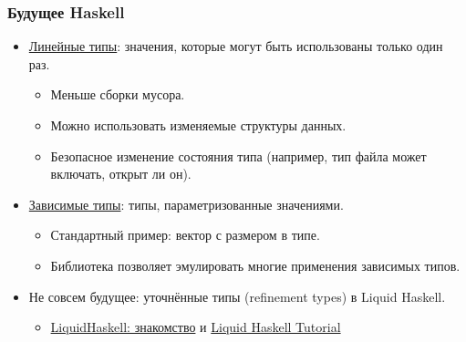 \documentclass[11pt]{beamer}
\begin{document}
\begin{frame}[fragile]
  \frametitle{Будущее Haskell}
  \begin{itemize}
    \item \href{https://www.tweag.io/posts/2017-03-13-linear-types.html}{Линейные типы}: значения, которые могут быть использованы только один раз.
          \begin{itemize}
            \item Меньше сборки мусора.
            \item Можно использовать изменяемые структуры данных.
            \item Безопасное изменение состояния типа (например, тип файла может включать, открыт ли он).
          \end{itemize}
          \pause
    \item \href{https://serokell.io/blog/2018/12/17/why-dependent-haskell}{Зависимые типы}: типы, параметризованные значениями.
          \begin{itemize}
            \item Стандартный пример: вектор с размером в типе.
            \item Библиотека  позволяет эмулировать многие применения зависимых типов.
          \end{itemize}
          \pause
    \item Не совсем будущее: уточнённые типы (refinement types) в Liquid Haskell.
          \begin{itemize}
            \item \href{https://ruhaskell.org/posts/utils/2016/12/16/liquidhaskell-hello.html}{LiquidHaskell: знакомство} и \href{https://liquid.kosmikus.org/}{Liquid Haskell Tutorial}
          \end{itemize}
  \end{itemize}
\end{frame}
\end{document}
